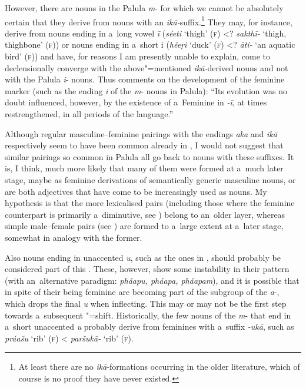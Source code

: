 However, there are nouns in the Palula \textit{m}- for which we cannot be absolutely
certain that they derive from \iliOIA nouns with an \textit{ikā-}suffix.\footnote{At least there are
  no \textit{ikā}-formations occurring in the older literature, which of course is no proof
  they have never existed.} They may, for instance, derive from nouns ending in a~long vowel
\textit{ī} (\textit{séeti} `thigh' (\textsc{f}) {\textless}? \textit{sakthī-} `thigh, thighbone' (\textsc{f})) or nouns ending in a~short i (\textit{héeṛi} `duck'
(\textsc{f}) {\textless}? \textit{ātí-} `an aquatic bird' (\textsc{f})) and have, for
reasons I am presently unable to explain, come to declensionally converge with the above"=mentioned
\textit{ikā-}derived nouns and not with the Palula \textit{i}- nouns. Thus
\citet[222]{masica1991} comments on the development of the \iliNIA feminine marker (such as the ending
\textit{i} of the \textit{m}- nouns in Palula): ``Its evolution was no doubt influenced,
however, by the existence of a~Feminine in \textit{-ī}, at times
restrengthened, in all periods of the language.''


Although regular masculine--feminine pairings with the endings \textit{aka} and \textit{ikā}
respectively seem to have been common already in \iliOIA, I would not suggest that similar pairings so
common in Palula all go back to nouns with these suffixes. It is, I think, much more likely that
many of them were formed at a~much later stage, maybe as feminine derivations of semantically
generic masculine nouns, or are both adjectives that have come to be increasingly used as nouns. My
hypothesis is that the more lexicalised pairs (including those where the feminine counterpart is
primarily a~diminutive, see ) belong to an~older layer, whereas simple
male--female pairs (see ) are formed to a~large extent at a~later stage, somewhat in
analogy with the former.


Also nouns ending in unaccented \textit{u}, such as the ones in , should probably be considered part of this . These, however, show some instability in their  pattern (with an~alternative paradigm: \textit{pháapu, pháapa, pháapam}), and it is possible that in spite of their being feminine are becoming part of the subgroup of the \textit{a}-, which drops the final \textit{u} when inflecting. This may or may not be the first step towards a~subsequent "=shift. Historically, the few nouns of the \textit{m}- that end in a~short unaccented \textit{u} probably derive from \iliOIA feminines with a~suffix \textit{-ukā}, such as \textit{práašu} `rib' (\textsc{f}) {\textless} \textit{paršukā-} `rib' (\textsc{f}).


